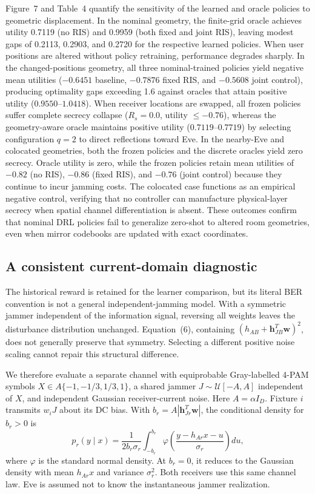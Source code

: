 \documentclass[journal,10pt,twocolumn]{IEEEtran}
\begin{document}
Figure~7 and Table~4 quantify the sensitivity of the learned and oracle policies to geometric displacement. In the nominal geometry, the finite-grid oracle achieves utility 0.7119 (no RIS) and 0.9959 (both fixed and joint RIS), leaving modest gaps of 0.2113, 0.2903, and 0.2720 for the respective learned policies. When user positions are altered without policy retraining, performance degrades sharply. In the changed-positions geometry, all three nominal-trained policies yield negative mean utilities ($-0.6451$ baseline, $-0.7876$ fixed RIS, and $-0.5608$ joint control), producing optimality gaps exceeding 1.6 against oracles that attain positive utility ($0.9550$--$1.0418$). When receiver locations are swapped, all frozen policies suffer complete secrecy collapse ($R_s=0.0$, utility $\le -0.76$), whereas the geometry-aware oracle maintains positive utility ($0.7119$--$0.7719$) by selecting configuration $q=2$ to direct reflections toward Eve. In the nearby-Eve and colocated geometries, both the frozen policies and the discrete oracles yield zero secrecy. Oracle utility is zero, while the frozen policies retain mean utilities of $-0.82$ (no RIS), $-0.86$ (fixed RIS), and $-0.76$ (joint control) because they continue to incur jamming costs. The colocated case functions as an empirical negative control, verifying that no controller can manufacture physical-layer secrecy when spatial channel differentiation is absent. These outcomes confirm that nominal DRL policies fail to generalize zero-shot to altered room geometries, even when mirror codebooks are updated with exact coordinates.

\subsection{A consistent current-domain diagnostic}
The historical reward is retained for the learner comparison, but its literal BER convention is not a general independent-jamming model. With a symmetric jammer independent of the information signal, reversing all weights leaves the disturbance distribution unchanged. Equation~(6), containing $(h_{AB}+\mathbf{h}_{JB}^{T}\mathbf{w})^2$, does not generally preserve that symmetry. Selecting a different positive noise scaling cannot repair this structural difference.

We therefore evaluate a separate channel with equiprobable Gray-labelled 4-PAM symbols $X\in A\{-1,-1/3,1/3,1\}$, a shared jammer $J\sim\mathcal{U}[-A,A]$ independent of $X$, and independent Gaussian receiver-current noise. Here $A=\alpha I_D$. Fixture $i$ transmits $w_iJ$ about its DC bias. With $b_r=A|\mathbf{h}_{Jr}^{T}\mathbf{w}|$, the conditional density for $b_r>0$ is
\begin{equation}
p_r(y\mid x)=\frac{1}{2b_r\sigma_r}\int_{-b_r}^{b_r}
\varphi\!\left(\frac{y-h_{Ar}x-u}{\sigma_r}\right)du,

\end{equation}
where $\varphi$ is the standard normal density. At $b_r=0$, it reduces to the Gaussian density with mean $h_{Ar}x$ and variance $\sigma_r^2$. Both receivers use this same channel law. Eve is assumed not to know the instantaneous jammer realization.
\end{document}
